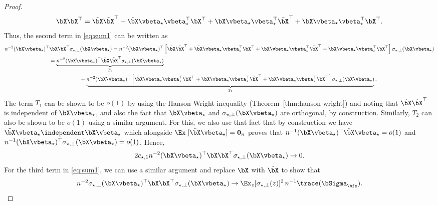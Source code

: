 \begin{proof}
    \begin{align*}
        \bX\bX^\top =  \tilde\bX\tilde\bX^\top + \tilde\bX\vbeta_\star\vbeta_\star^\top \bX^\top + \bX\vbeta_\star\vbeta_\star^\top\tilde\bX^\top + \bX\vbeta_\star\vbeta_\star^\top\bX^\top.
    \end{align*}
    Thus, the second term in \eqref{eq:sum1} can be written as
    \begin{align*}
        n^{-2} (\bX\vbeta_\star)^\top &\bX\bX^\top \sigma_{\star,\perp}(\bX\vbeta_\star) = n^{-2} (\bX\vbeta_\star)^\top \left[\tilde\bX\tilde\bX^\top + \tilde\bX\vbeta_\star\vbeta_\star^\top \bX^\top + \bX\vbeta_\star\vbeta_\star^\top\tilde\bX^\top + \bX\vbeta_\star\vbeta_\star^\top\bX^\top\right] \sigma_{\star,\perp}(\bX\vbeta_\star)\\
        &=\underbrace{n^{-2} (\bX\vbeta_\star)^\top \tilde\bX\tilde\bX^\top \sigma_{\star,\perp}(\bX\vbeta_\star)}_{T_1}\\ &\hspace{2cm}+  \underbrace{n^{-2} (\bX\vbeta_\star)^\top \left[ \tilde\bX\vbeta_\star\vbeta_\star^\top \bX^\top + \bX\vbeta_\star\vbeta_\star^\top\tilde\bX^\top + \bX\vbeta_\star\vbeta_\star^\top\bX^\top\right] \sigma_{\star,\perp}(\bX\vbeta_\star)}_{T_2}.
    \end{align*}
    The term $T_1$ can be shown to be $o(1)$ by using the Hanson-Wright inequality (Theorem~\ref{thm:hanson-wright}) and noting that $\tilde\bX\tilde\bX^\top$ is independent of $\bX\vbeta_\star$, and also the fact that  $\bX\vbeta_\star$ and $\sigma_{\star,\perp}(\bX\vbeta_\star)$ are orthogonal, by construction. Similarly, $T_2$ can also be shown to be $o(1)$ using a similar argument. For this, we also use that fact that by construction we have $\tilde\bX\vbeta_\star \independent \bX\vbeta_\star$ which alongside $\Ex \; [\tilde\bX\vbeta_\star] = \mathbf{0}_n$ proves that $n^{-1} (\bX\vbeta_\star)^\top \tilde\bX\vbeta_\star = o(1)$ and $n^{-1} (\tilde\bX\vbeta_\star)^\top \sigma_{\star,\perp}(\tilde\bX\vbeta_\star) = o(1)$. Hence, 
    \begin{align*}
        2  c_{\star,1}n^{-2} (\bX\vbeta_\star)^\top \bX\bX^\top \sigma_{\star,\perp}(\bX\vbeta_\star) \to 0.
    \end{align*}
    For the third term in \eqref{eq:sum1}, we can use a similar argument and replace $\bX$ with $\tilde\bX$ to show that
    \begin{align*}
        n^{-2} \sigma_{\star,\perp}(\bX\vbeta_\star)^\top \bX\bX^\top \sigma_{\star,\perp}(\bX\vbeta_\star) \to \Ex_z [\sigma_{\star, \perp}(z)]^2 \, n^{-1} \trace(\bSigma_\bfx).

\end{align*}
\end{proof}
